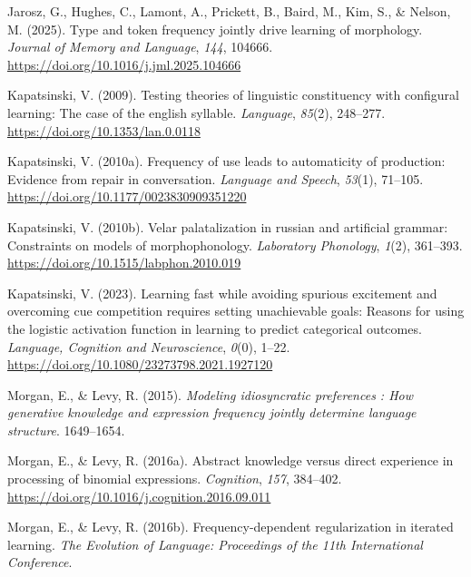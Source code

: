 \documentclass[
  letterpaper,
  DIV=11,
  numbers=noendperiod]{scrartcl}
\newlength{\cslhangindent}
\newenvironment{CSLReferences}[2] %
 {\begin{list}{}{%
  \setlength{\itemindent}{0pt}
  \setlength{\leftmargin}{0pt}
  \setlength{\parsep}{0pt}
  \ifodd #1
   \setlength{\leftmargin}{\cslhangindent}
   \setlength{\itemindent}{-1\cslhangindent}
  \fi
  \setlength{\itemsep}{#2\baselineskip}}}
 {\end{list}}
\begin{document}
\begin{CSLReferences}{1}{0}
Jarosz, G., Hughes, C., Lamont, A., Prickett, B., Baird, M., Kim, S., \&
Nelson, M. (2025). Type and token frequency jointly drive learning of
morphology. \emph{Journal of Memory and Language}, \emph{144}, 104666.
\url{https://doi.org/10.1016/j.jml.2025.104666}

Kapatsinski, V. (2009). Testing theories of linguistic constituency with
configural learning: The case of the english syllable. \emph{Language},
\emph{85}(2), 248--277. \url{https://doi.org/10.1353/lan.0.0118}

Kapatsinski, V. (2010a). Frequency of use leads to automaticity of
production: Evidence from repair in conversation. \emph{Language and
Speech}, \emph{53}(1), 71--105.
\url{https://doi.org/10.1177/0023830909351220}

Kapatsinski, V. (2010b). Velar palatalization in russian and artificial
grammar: Constraints on models of morphophonology. \emph{Laboratory
Phonology}, \emph{1}(2), 361--393.
\url{https://doi.org/10.1515/labphon.2010.019}

Kapatsinski, V. (2023). Learning fast while avoiding spurious excitement
and overcoming cue competition requires setting unachievable goals:
Reasons for using the logistic activation function in learning to
predict categorical outcomes. \emph{Language, Cognition and
Neuroscience}, \emph{0}(0), 1--22.
\url{https://doi.org/10.1080/23273798.2021.1927120}

Morgan, E., \& Levy, R. (2015). \emph{Modeling idiosyncratic preferences
: How generative knowledge and expression frequency jointly determine
language structure}. 1649--1654.

Morgan, E., \& Levy, R. (2016a). Abstract knowledge versus direct
experience in processing of binomial expressions. \emph{Cognition},
\emph{157}, 384--402.
\url{https://doi.org/10.1016/j.cognition.2016.09.011}

Morgan, E., \& Levy, R. (2016b). Frequency-dependent regularization in
iterated learning. \emph{The Evolution of Language: Proceedings of the
11th International Conference}.


\end{CSLReferences}
\end{document}
